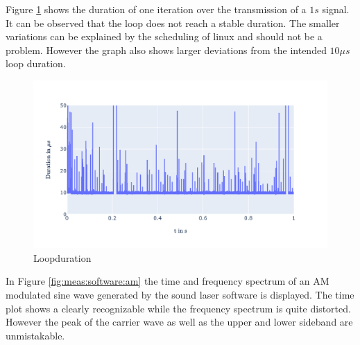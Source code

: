 Figure \ref{fig:meas:software:duration} shows the duration of one iteration over the transmission of a $1s$ signal. It can be observed that the loop does not reach a stable duration. The smaller variations can be explained by the scheduling of linux and should not be a problem. However the graph also shows larger deviations from the intended $10\mu s$ loop duration.
%
\begin{figure}
  \centering
  \includegraphics[height=\mediumheight]{src/assets/pictures/measurements/software_duration.pdf}
  \caption{Loopduration}\label{fig:meas:software:duration}
\end{figure}
%
In Figure \ref{fig:meas:software:am} the time and frequency spectrum of an AM modulated sine wave generated by the sound laser software is displayed. The time plot shows a clearly recognizable while the frequency spectrum is quite distorted. However the peak of the carrier wave as well as the upper and lower sideband are unmistakable.
%
